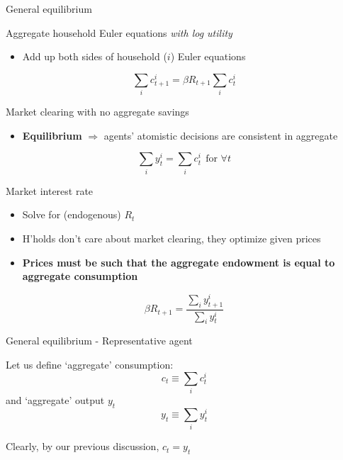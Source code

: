 
\begin{frame}{General equilibrium}

Aggregate household Euler equations \emph{with log utility}
	\begin{itemize}
	\item	Add up both sides of household ($i$) Euler equations
	\end{itemize}
\begin{equation*}
\sum_{i}c_{t+1}^{i}=\beta R_{t+1}\sum_{i}c_{t}^{i}
\end{equation*}

Market clearing with no aggregate savings
\begin{itemize}
\item	\textbf{Equilibrium} $\Rightarrow$ agents' atomistic decisions are consistent in aggregate
\end{itemize}
\begin{equation*}
\sum_{i}y_{t}^{i}=\sum_{i}c_{t}^{i}\ \ \text{for }\forall t
\end{equation*}

Market interest rate
\begin{itemize}
\item	Solve for (endogenous) $R_{t}$
\item	H'holds don't care about market clearing, they optimize given prices
\item	\textbf{Prices must be such that the aggregate endowment is equal to aggregate consumption}
\end{itemize}
\begin{equation*}
\beta R_{t+1}=\frac{\sum_{i}y_{t+1}^{i}}{\sum_{i}y_{t}^{i}}
\end{equation*}

\end{frame}


\begin{frame}{General equilibrium - Representative agent}

Let us define `aggregate' consumption:
\[
c_{t} \equiv \sum\limits_{i} c_{t}^{i}
\]
and `aggregate' output $y_{t}$
\[
y_{t} \equiv \sum\limits_{i} y_{t}^{i}
\]

Clearly, by our previous discussion, $c_{t}=y_{t}$

\end{frame}

